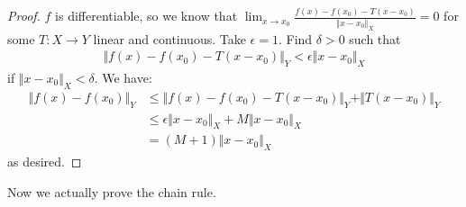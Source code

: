 \documentclass{report}
\begin{document}
\begin{proof}
    $f$ is differentiable, so we know that $\lim_{x \to x_0} \frac{f(x) - f(x_0) -T(x - x_0)}{\Vert x - x_0 \Vert_X} = 0$ for some $T: X \to Y$ linear and continuous. Take $\epsilon = 1$. Find $\delta > 0$ such that 
    \begin{align*}
        \Vert f(x) - f(x_0) - T(x-x_0) \Vert_Y < \epsilon \Vert x-x_0 \Vert_X
    \end{align*}
    if $\Vert x - x_0 \Vert_X < \delta$. We have:
    \begin{align*}
        \Vert f(x) - f(x_0) \Vert_Y &\leq \Vert f(x) - f(x_0) - T(x-x_0) \Vert_Y + \Vert T(x-x_0) \Vert_Y \\
        &\leq \epsilon \Vert x-x_0 \Vert_X + M \Vert x-x_0 \Vert_X \\
        &= (M+1)\Vert x - x_0 \Vert_X
    \end{align*}
    as desired.
\end{proof}
\newpage
\noindent Now we actually prove the chain rule.
\end{document}
